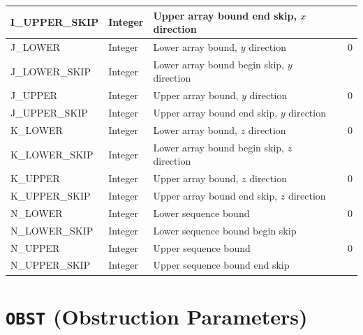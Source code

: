 \documentclass[11pt]{book}
\begin{document}
\begin{longtable}{@{\extracolsep{\fill}}|l|l|l|l|l|}
{\ct I\_UPPER\_SKIP} & Integer          & Upper array bound end skip, $x$ direction   &    &                            \\ \hline
{\ct J\_LOWER}       & Integer          & Lower array bound, $y$ direction            &    & 0                          \\ \hline
{\ct J\_LOWER\_SKIP} & Integer          & Lower array bound begin skip, $y$ direction &    &                            \\ \hline
{\ct J\_UPPER}       & Integer          & Upper array bound, $y$ direction            &    & 0                          \\ \hline
{\ct J\_UPPER\_SKIP} & Integer          & Upper array bound end skip, $y$ direction   &    &                            \\ \hline
{\ct K\_LOWER}       & Integer          & Lower array bound, $z$ direction            &    & 0                          \\ \hline
{\ct K\_LOWER\_SKIP} & Integer          & Lower array bound begin skip, $z$ direction &    &                            \\ \hline
{\ct K\_UPPER}       & Integer          & Upper array bound, $z$ direction            &    & 0                          \\ \hline
{\ct K\_UPPER\_SKIP} & Integer          & Upper array bound end skip, $z$ direction   &    &                            \\ \hline
{\ct N\_LOWER}       & Integer          & Lower sequence bound                        &    & 0                          \\ \hline
{\ct N\_LOWER\_SKIP} & Integer          & Lower sequence bound begin skip             &    &                            \\ \hline
{\ct N\_UPPER}       & Integer          & Upper sequence bound                        &    & 0                          \\ \hline
{\ct N\_UPPER\_SKIP} & Integer          & Upper sequence bound end skip               &    &                            \\ \hline
\end{longtable}


\vspace{\baselineskip}



\section{\texorpdfstring{{\tt OBST}}{OBST} (Obstruction Parameters)}
\end{document}
